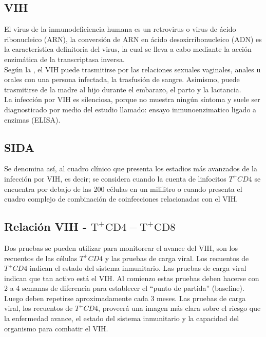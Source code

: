 \subsection{VIH}

	El virus de la inmunodeficiencia humana es un retrovirus o virus de \'acido ribonucleico (ARN), la conversi\'on de ARN en \'acido desoxirribonucleico (ADN) es la caracter\'istica definitoria del virus, la cual se lleva a cabo mediante la acci\'on enzim\'atica de la transcriptasa inversa. \\

	Seg\'un la \citet{oms}, el VIH puede trasmitirse por las relaciones sexuales vaginales, anales u orales con una persona infectada, la trasfusi\'on de sangre. Asimismo, puede trasmitirse de la madre al hijo durante el embarazo, el parto y la lactancia.\\

	La infecci\'on por VIH es silenciosa, porque no muestra ning\'un s\'intoma y suele ser diagnosticado por medio del estudio llamado: ensayo inmunoenzimatico ligado a enzimas (ELISA). \citet{bcs}
	
\subsection{SIDA}
	
	Se denomina as\'i, al cuadro cl\'inico que presenta los estadios m\'as avanzados de la infecci\'on por VIH, es decir; se considera cuando la cuenta de linfocitos $T^{+}CD4$ se encuentra por debajo de las 200 c\'elulas en un mililitro o cuando presenta el cuadro complejo de combinaci\'on de coinfecciones relacionadas con el VIH. \citet{bcs}	

\subsection{Relaci\'on VIH - $\mathrm{T^{+}CD4 - T^{+}CD8}$}

	Dos pruebas se pueden utilizar para monitorear el avance del VIH, son los recuentos de las c\'elulas $T^{+}CD4$ y las pruebas de carga viral. Los recuentos de $T^{+}CD4$ indican el estado del sistema inmunitario. Las pruebas de carga viral indican que tan activo est\'a el VIH. Al comienzo estas pruebas deben hacerse con 2 a 4 semanas de diferencia para establecer el “punto de partida” (baseline). Luego deben repetirse aproximadamente cada 3 meses. Las pruebas de carga viral, los recuentos de $T^{+}CD4$, proveer\'a una imagen m\'as clara sobre el riesgo que la enfermedad avance, el estado del sistema inmunitario y la capacidad del organismo para combatir el VIH.\\

